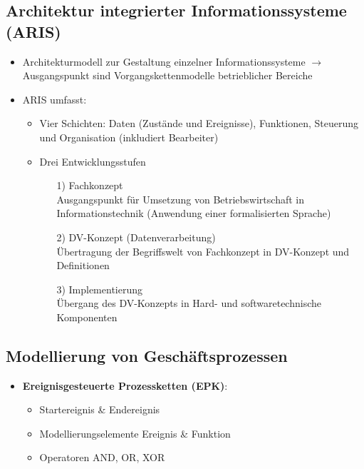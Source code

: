 \documentclass[12pt,a4paper]{article}
\begin{document}
\subsection{Architektur integrierter Informationssysteme (ARIS)} %
\begin{itemize}
   \item Architekturmodell zur Gestaltung einzelner Informationssysteme
          $\rightarrow$ Ausgangspunkt sind Vorgangskettenmodelle betrieblicher Bereiche
   \item ARIS umfasst:
      \begin{itemize}
        \item Vier Schichten: Daten (Zustände und Ereignisse), Funktionen, Steuerung und Organisation (inkludiert Bearbeiter)
        \item Drei Entwicklungsstufen
	        \begin{itemize}
	            \item[1)] Fachkonzept\\
	                  Ausgangspunkt für Umsetzung von Betriebswirtschaft in Informationstechnik
	                  (Anwendung einer formalisierten Sprache)
	            \item[2)] DV-Konzept (Datenverarbeitung)\\
	                  Übertragung der Begriffswelt von Fachkonzept in DV-Konzept und Definitionen
	            \item[3)] Implementierung\\
	                  Übergang des DV-Konzepts in Hard- und softwaretechnische Komponenten
	        \end{itemize}
      \end{itemize}
\end{itemize}


\subsection{Modellierung von Geschäftsprozessen} %
\begin{itemize}
   \item \textbf{Ereignisgesteuerte Prozessketten (EPK)}:
       \begin{itemize}
		   \item Startereignis \& Endereignis
		   \item Modellierungselemente Ereignis \& Funktion
		   \item Operatoren AND, OR, XOR
		\end{itemize}
\end{itemize}
\end{document}
